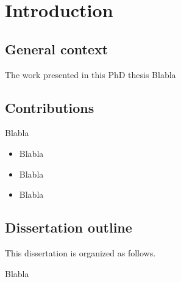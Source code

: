 
\chapter*{Introduction}
\minitoc
\label{chapter:Intro}
\graphicspath{{2-Chapters/1-Chapter/Images/}}


\section*{General context}


\indent
The work presented in this PhD thesis
Blabla

\section*{Contributions}

Blabla

\begin{itemize}
\item Blabla
\item Blabla
\item Blabla
\end{itemize}

\section*{Dissertation outline}
This dissertation is organized as follows.

Blabla